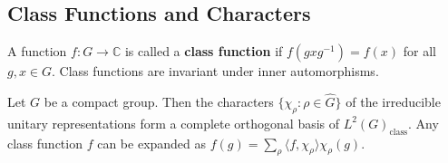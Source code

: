 \subsection{Class Functions and Characters}

\begin{definition}\label{def:class_function}
A function $f: G \to \mathbb{C}$ is called a \textbf{class function} if $f(g x g^{-1}) = f(x)$ for all $g, x \in G$. Class functions are invariant under inner automorphisms.
\end{definition}

\begin{theorem}\label{thm:class_function_expansion}
Let $G$ be a compact group. Then the characters $\{\chi_\rho : \rho \in \widehat{G}\}$ of the irreducible unitary representations form a complete orthogonal basis of $L^2(G)_{\text{class}}$. Any class function $f$ can be expanded as $f(g) = \sum_{\rho} \langle f, \chi_\rho \rangle \chi_\rho(g)$.
\end{theorem}

